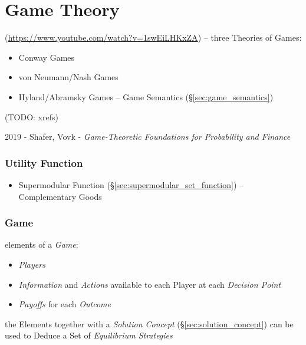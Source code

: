 \part{Game Theory}\label{sec:game_theory}

(\url{https://www.youtube.com/watch?v=1swEiLHKxZA}) -- three Theories of Games:
\begin{itemize}
  \item Conway Games
  \item von Neumann/Nash Games
  \item Hyland/Abramsky Games -- Game Semantics (\S\ref{sec:game_semantics})
\end{itemize}
(TODO: xrefs)

2019 - Shafer, Vovk
- \emph{Game-Theoretic Foundations for Probability and Finance}



\section{Utility Function}\label{sec:utility_function}


\begin{itemize}
  \item Supermodular Function (\S\ref{sec:supermodular_set_function}) --
    Complementary Goods
\end{itemize}



\section{Game}\label{sec:game}

elements of a \emph{Game}:
\begin{itemize}
  \item \emph{Players}
  \item \emph{Information} and \emph{Actions} available to each Player at each
    \emph{Decision Point}
  \item \emph{Payoffs} for each \emph{Outcome}
\end{itemize}
the Elements together with a \emph{Solution Concept}
(\S\ref{sec:solution_concept}) can be used to Deduce a Set of \emph{Equilibrium
  Strategies}

